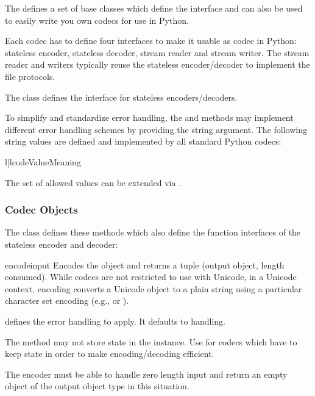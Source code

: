 The  defines a set of base classes which define the
interface and can also be used to easily write you own codecs for use
in Python.

Each codec has to define four interfaces to make it usable as codec in
Python: stateless encoder, stateless decoder, stream reader and stream
writer. The stream reader and writers typically reuse the stateless
encoder/decoder to implement the file protocols.

The  class defines the interface for stateless
encoders/decoders.

To simplify and standardize error handling, the  and
 methods may implement different error handling
schemes by providing the  string argument.  The following
string values are defined and implemented by all standard Python
codecs:

\begin{tableii}{l|l}{code}{Value}{Meaning}
\end{tableii}

The set of allowed values can be extended via .


\subsubsection{Codec Objects \label{codec-objects}}

The  class defines these methods which also define the
function interfaces of the stateless encoder and decoder:

\begin{methoddesc}{encode}{input}
  Encodes the object  and returns a tuple (output object,
  length consumed).  While codecs are not restricted to use with Unicode, in
  a Unicode context, encoding converts a Unicode object to a plain string
  using a particular character set encoding (e.g.,  or
  ).

   defines the error handling to apply. It defaults to
   handling.

  The method may not store state in the  instance. Use
   for codecs which have to keep state in order to
  make encoding/decoding efficient.

  The encoder must be able to handle zero length input and return an
  empty object of the output object type in this situation.
\end{methoddesc}

